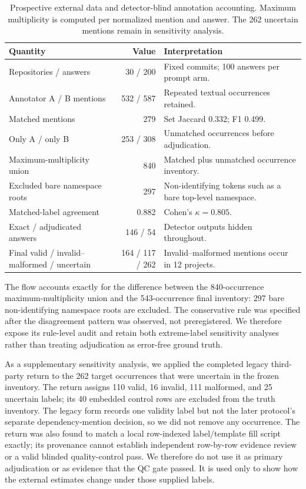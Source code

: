 \documentclass[pdflatex,sn-basic]{sn-jnl}
\begin{document}
\begin{table}[htbp]
\caption{Prospective external data and detector-blind annotation accounting. Maximum multiplicity is computed per normalized mention and answer. The 262 uncertain mentions remain in sensitivity analysis.}
\label{tab:external-data-agreement}
{\footnotesize
\setlength{\tabcolsep}{4pt}
\begin{tabularx}{\linewidth}{@{}l r Y@{}}
\toprule
Quantity & Value & Interpretation \\
\midrule
Repositories / answers & 30 / 200 & Fixed commits; 100 answers per prompt arm. \\
Annotator A / B mentions & 532 / 587 & Repeated textual occurrences retained. \\
Matched mentions & 279 & Set Jaccard 0.332; F1 0.499. \\
Only A / only B & 253 / 308 & Unmatched occurrences before adjudication. \\
Maximum-multiplicity union & 840 & Matched plus unmatched occurrence inventory. \\
Excluded bare namespace roots & 297 & Non-identifying tokens such as a bare top-level namespace. \\
Matched-label agreement & 0.882 & Cohen's $\kappa=0.805$. \\
Exact / adjudicated answers & 146 / 54 & Detector outputs hidden throughout. \\
Final valid / invalid--malformed / uncertain & 164 / 117 / 262 & Invalid--malformed mentions occur in 12 projects. \\
\bottomrule
\end{tabularx}
}
\end{table}

The flow accounts exactly for the difference between the 840-occurrence maximum-multiplicity union and the 543-occurrence final inventory: 297 bare non-identifying namespace roots are excluded. The conservative rule was specified after the disagreement pattern was observed, not preregistered. We therefore expose its rule-level audit and retain both extreme-label sensitivity analyses rather than treating adjudication as error-free ground truth.

As a supplementary sensitivity analysis, we applied the completed legacy third-party return to the 262 target occurrences that were uncertain in the frozen inventory. The return assigns 110 valid, 16 invalid, 111 malformed, and 25 uncertain labels; its 40 embedded control rows are excluded from the truth inventory. The legacy form records one validity label but not the later protocol's separate dependency-mention decision, so we did not remove any occurrence. The return was also found to match a local row-indexed label/template fill script exactly; its provenance cannot establish independent row-by-row evidence review or a valid blinded quality-control pass. We therefore do not use it as primary adjudication or as evidence that the QC gate passed. It is used only to show how the external estimates change under those supplied labels.
\end{document}
